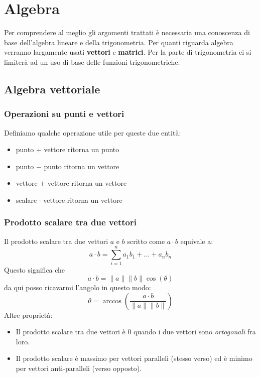 \chapter{Algebra}
Per comprendere al meglio gli argomenti trattati \`e necessaria una conoscenza di base
dell'algebra lineare e della trigonometria. Per quanti riguarda algebra verranno largamente usati
\textbf{vettori} e \textbf{matrici}. Per la parte di trigonometria ci si limiter\`a ad un uso di base
delle funzioni trigonometriche.

\section{Algebra vettoriale}
\subsection{Operazioni su punti e vettori}
Definiamo qualche operazione utile per queste due entit\`a:
\begin{itemize}
	\item punto $+$ vettore ritorna un punto
	\item punto $-$ punto ritorna un vettore
	\item vettore $+$ vettore ritorna un vettore
	\item scalare $\cdot$ vettore ritorna un vettore
\end{itemize}

\subsection{Prodotto scalare tra due vettori}
Il prodotto scalare tra due vettori $a$ e $b$ scritto come $a \cdot b$ equivale a:
\[ a \cdot b = \sum_{i=1}^n a_1 b_1 + \dots + a_n b_n  \]
Questo significa che
\[ a \cdot b = \| a \| \| b \| \cos{(\theta)} \]
da qui posso ricavarmi l'angolo in questo modo:
\[ \theta = \arccos{\left( \frac{a \cdot b}{\| a \| \| b \|} \right)} \]
Altre propriet\`a:
\begin{itemize}
	\item Il prodotto scalare tra due vettori \`e 0 quando i due vettori sono \emph{ortogonali}
	      fra loro.
	\item Il prodotto scalare \`e massimo per vettori paralleli (stesso verso) ed \`e minimo
	      per vettori anti-paralleli (verso opposto).
\end{itemize}

